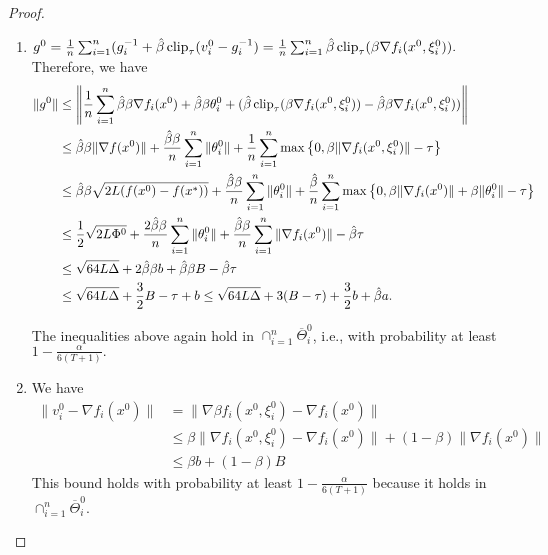 \documentclass[a4paper,11pt]{article}
\begin{document}
\begin{proof}
\begin{enumerate}
        \item $g^0 = \frac{1}{n}\sum_{i=1}^n (g_i^{-1} + \hat{\beta}\operatorname{clip}_\tau(v_i^0 - g_i^{-1}) = \frac{1}{n}\sum_{i=1}^n\hat{\beta}\operatorname{clip}_\tau(\beta\nabla f_i(x^0,\xi^0_i)).$ Therefore, we have
        \begin{align*}
            \|g^0\| &\le \left\|\frac{1}{n}\sum_{i=1}^n\hat{\beta}\beta\nabla f_i(x^0) + \hat{\beta}\beta\theta^0_i + (\hat{\beta}\operatorname{clip}_\tau(\beta\nabla f_i(x^0,\xi^0_i)) - \hat{\beta}\beta\nabla f_i(x^0,\xi^0_i))\right\|\\
            &\le \hat{\beta}\beta\|\nabla f(x^0)\|
            + \frac{\hat{\beta}\beta}{n}\sum_{i=1}^n\|\theta^0_i\|
            + \frac{1}{n}\sum_{i=1}^n\max\left\{0, \beta\|\nabla f_i(x^0,\xi^0_i)\| - \tau\right\}\\
            &\le \hat{\beta}\beta\sqrt{2L(f(x^0)-f(x^*))}
            + \frac{\hat{\beta}\beta}{n}\sum_{i=1}^n\|\theta^0_i\| 
            + \frac{\hat{\beta}}{n}\sum_{i=1}^n\max\left\{0, \beta\|\nabla f_i(x^0)\| + \beta\|\theta^0_i\|- \tau\right\}\\
            &\le \frac{1}{2}\sqrt{2L\Phi^0} 
            + \frac{2\hat{\beta}\beta}{n}\sum_{i=1}^n\|\theta^0_i\|
            + \frac{\hat{\beta}\beta}{n}\sum_{i=1}^n\|\nabla f_i(x^0)\| - \hat{\beta}\tau\\
            &\le \sqrt{64L\Delta} 
            + 2\hat{\beta}\beta b + \hat{\beta}\beta B - \hat{\beta}\tau\\
            &\le \sqrt{64L\Delta} 
            + \frac{3}{2} B - \tau  + b \le \sqrt{64L\Delta} + 3(B-\tau) + \frac{3}{2}b + \hat{\beta}a.
        \end{align*}

        
        The inequalities above again hold in $\cap_{i=1}^n\overline{\Theta}_i^0$, i.e., with probability at least $1-\frac{\alpha}{6(T+1)}.$

        \item We have 
        \begin{align*}
            \|v_i^0 - \nabla f_i(x^0)\| &= \|\nabla \beta f_i(x^0,\xi_i^0) - \nabla f_i(x^0)\|\\ &\le \beta\|\nabla f_i(x^0, \xi^0_i) - \nabla f_i(x^0)\| + (1-\beta)\|\nabla f_i(x^0)\|\\
            &\le \beta b + (1-\beta)B
        \end{align*}
        This bound holds with probability at least $1-\frac{\alpha}{6(T+1)}$ because it holds in $\cap_{i=1}^n\overline{\Theta}_i^0.$
        

\end{enumerate}
\end{proof}
\end{document}
